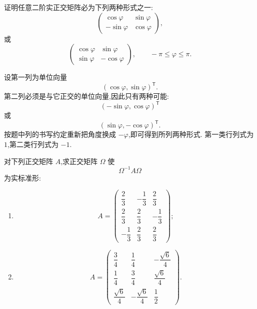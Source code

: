 \begin{example}[\markstar]
证明任意二阶实正交矩阵必为下列两种形式之一:
\[
\begin{pmatrix}
\cos\varphi&\sin\varphi\\
-\sin\varphi&\cos\varphi
\end{pmatrix},
\]
或
\[
\begin{pmatrix}
\cos\varphi&\sin\varphi\\
\sin\varphi&-\cos\varphi
\end{pmatrix},
\qquad
-\pi\le\varphi\le\pi.
\]
\end{example}
\exampleblank

\begin{solution}
设第一列为单位向量
\[
(\cos\varphi,\sin\varphi)^{\mathsf T}.
\]
第二列必须是与它正交的单位向量,因此只有两种可能:
\[
(-\sin\varphi,\cos\varphi)^{\mathsf T}
\]
或
\[
(\sin\varphi,-\cos\varphi)^{\mathsf T}.
\]
按题中列的书写约定重新把角度换成 $-\varphi$,即可得到所列两种形式.
第一类行列式为 $1$,第二类行列式为 $-1$.
\end{solution}


\begin{example}[\markstar]
对下列正交矩阵 $A$,求正交矩阵 $\Omega$ 使
\[
\Omega^{-1}A\Omega
\]
为实标准形:
\begin{enumerate}
    \item
    \[
    A=
    \begin{pmatrix}
    \dfrac23&-\dfrac13&\dfrac23\\[3pt]
    \dfrac23&\dfrac23&-\dfrac13\\[3pt]
    -\dfrac13&\dfrac23&\dfrac23
    \end{pmatrix};
    \]
    \item
    \[
    A=
    \begin{pmatrix}
    \dfrac34&\dfrac14&-\dfrac{\sqrt6}{4}\\[3pt]
    \dfrac14&\dfrac34&\dfrac{\sqrt6}{4}\\[3pt]
    \dfrac{\sqrt6}{4}&-\dfrac{\sqrt6}{4}&\dfrac12
    \end{pmatrix}.
    \]
\end{enumerate}
\end{example}
\exampleblank

